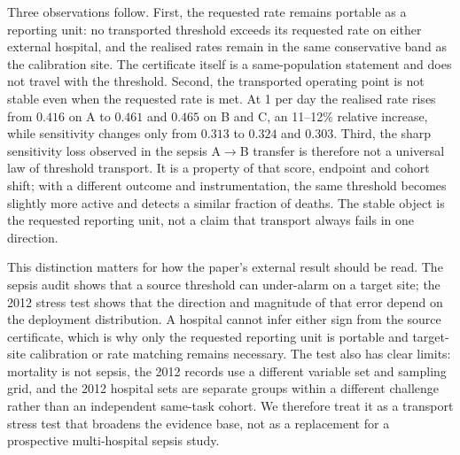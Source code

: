 Three observations follow. First, the requested rate remains portable as a reporting unit: no transported threshold exceeds its requested rate on either external hospital, and the realised rates remain in the same conservative band as the calibration site. The certificate itself is a same-population statement and does not travel with the threshold. Second, the transported operating point is not stable even when the requested rate is met. At 1 per day the realised rate rises from $0.416$ on A to $0.461$ and $0.465$ on B and C, an 11--12\% relative increase, while sensitivity changes only from $0.313$ to $0.324$ and $0.303$. Third, the sharp sensitivity loss observed in the sepsis A$\rightarrow$B transfer is therefore not a universal law of threshold transport. It is a property of that score, endpoint and cohort shift; with a different outcome and instrumentation, the same threshold becomes slightly more active and detects a similar fraction of deaths. The stable object is the requested reporting unit, not a claim that transport always fails in one direction.

This distinction matters for how the paper's external result should be read. The sepsis audit shows that a source threshold can under-alarm on a target site; the 2012 stress test shows that the direction and magnitude of that error depend on the deployment distribution. A hospital cannot infer either sign from the source certificate, which is why only the requested reporting unit is portable and target-site calibration or rate matching remains necessary. The test also has clear limits: mortality is not sepsis, the 2012 records use a different variable set and sampling grid, and the 2012 hospital sets are separate groups within a different challenge rather than an independent same-task cohort. We therefore treat it as a transport stress test that broadens the evidence base, not as a replacement for a prospective multi-hospital sepsis study.
